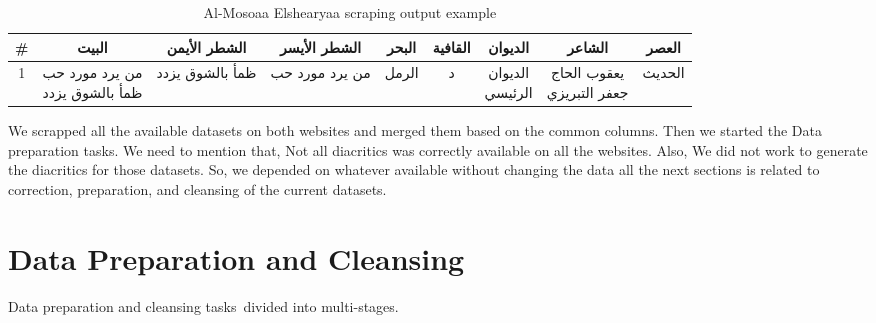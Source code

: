 \begin{enumerate}
\begin{table}[H]
	\centering
	\begin{tabular}{c c c c c c c c c}
          \toprule
\small{\textbf{\#}} &
\small{\textbf{\textarabic{البيت}}} &
\small{\textbf{\textarabic{الشطر الأيمن}}}&                        \small{\textbf{\textarabic{الشطر الأيسر}}} &
\small{\textbf{\textarabic{البحر}}}&                                 \small{\textbf{\textarabic{القافية}}}& \small{\textbf{\textarabic{الديوان}}}&                               \small{\textbf{\textarabic{الشاعر}}}&
\small{\textbf{\textarabic{العصر}}}\\
          \midrule
1 &          
\makecell{\textarabic{من يرد مورد حب} \\ \textarabic{ظمأ بالشوق يزدد}} &
\textarabic{ظمأ بالشوق يزدد} &                                                        \textarabic{من يرد مورد حب} &                                                       \textarabic{الرمل}&
\textarabic{د}&
\makecell{\textarabic{الديوان} \\ \textarabic{الرئيسي}}&
\makecell{\textarabic{يعقوب الحاج}\\ \textarabic{ جعفر التبريزي}}&
\textarabic{الحديث}\\
          
		\bottomrule
	\end{tabular}
	\caption{Al-Mosoaa Elshearyaa scraping output example }\label{tables:ElMosoaa_Sample}
\end{table}
\end{enumerate}

We scrapped all the available datasets on both websites and merged them based on the common columns. Then we started the Data preparation tasks. We need to mention that, Not all diacritics was correctly available on all the websites. Also, We did not work to generate the diacritics for those datasets. So, we depended on whatever available without changing the data all the next sections is related to correction, preparation, and cleansing of the current datasets.
\newpage
\section{Data Preparation and Cleansing}\label{sec:data_clens}

Data preparation and cleansing tasks divided into multi-stages.

